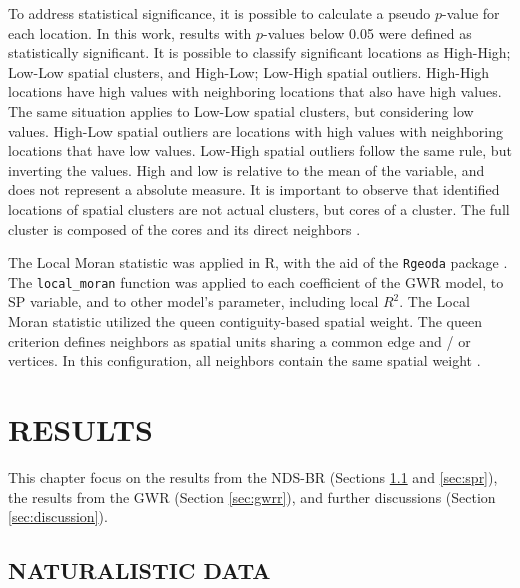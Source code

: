 To address statistical significance, it is possible to calculate a pseudo $p$-value for each location. In this work, results with $p$-values below 0.05 were defined as statistically significant. It is possible to classify significant locations as High-High; Low-Low spatial clusters, and High-Low; Low-High spatial outliers. High-High locations have high values with neighboring locations that also have high values. The same situation applies to Low-Low spatial clusters, but considering low values. High-Low spatial outliers are locations with high values with neighboring locations that have low values. Low-High spatial outliers follow the same rule, but inverting the values. High and low is relative to the mean of the variable, and does not represent a absolute measure. It is important to observe that identified locations of spatial clusters are not actual clusters, but cores of a cluster. The full cluster is composed of the cores and its direct neighbors \cite{anselinLocalIndicatorsSpatial2010}.

The Local Moran statistic was applied in R, with the aid of the \verb|Rgeoda| package \cite{liRgeodaLibrarySpatial2021}. The \verb|local_moran| function was applied to each coefficient of the GWR model, to SP variable, and to other model's parameter, including local $R^2$. The Local Moran statistic utilized the queen contiguity-based spatial weight. The queen criterion defines neighbors as spatial units sharing a common edge and / or vertices. In this configuration, all neighbors contain the same spatial weight \cite{Bivand2013}. 


\chapter{RESULTS} \label{cap:results}


This chapter focus on the results from the NDS-BR (Sections \ref{sec:ndsr} and \ref{sec:spr}), the results from the GWR (Section \ref{sec:gwrr}), and further discussions (Section \ref{sec:discussion}).

\section{NATURALISTIC DATA} \label{sec:ndsr}


